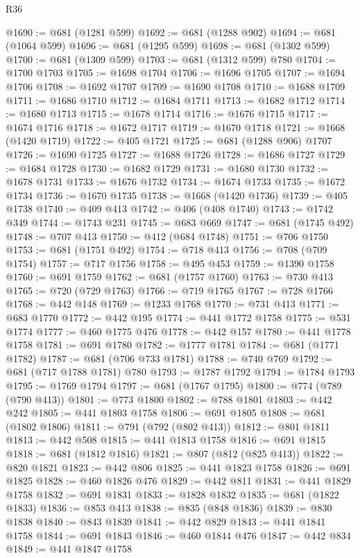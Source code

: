 \begin{lexlean}{R36}
\begin{coremodule}
@1690 := @681 (@1281 @599)
@1692 := @681 (@1288 @902)
@1694 := @681 (@1064 @599)
@1696 := @681 (@1295 @599)
@1698 := @681 (@1302 @599)
@1700 := @681 (@1309 @599)
@1703 := @681 (@1312 @599) @780
@1704 := @1700 @1703
@1705 := @1698 @1704
@1706 := @1696 @1705
@1707 := @1694 @1706
@1708 := @1692 @1707
@1709 := @1690 @1708
@1710 := @1688 @1709
@1711 := @1686 @1710
@1712 := @1684 @1711
@1713 := @1682 @1712
@1714 := @1680 @1713
@1715 := @1678 @1714
@1716 := @1676 @1715
@1717 := @1674 @1716
@1718 := @1672 @1717
@1719 := @1670 @1718
@1721 := @1668 (@1420 @1719)
@1722 := @405 @1721
@1725 := @681 (@1288 @906) @1707
@1726 := @1690 @1725
@1727 := @1688 @1726
@1728 := @1686 @1727
@1729 := @1684 @1728
@1730 := @1682 @1729
@1731 := @1680 @1730
@1732 := @1678 @1731
@1733 := @1676 @1732
@1734 := @1674 @1733
@1735 := @1672 @1734
@1736 := @1670 @1735
@1738 := @1668 (@1420 @1736)
@1739 := @405 @1738
@1740 := @409 @413
@1742 := @406 (@408 @1740)
@1743 := @1742 @349
@1744 := @1743 @231
@1745 := @683 @669
@1747 := @681 (@1745 @492)
@1748 := @707 @413
@1750 := @412 (@684 @1748)
@1751 := @706 @1750
@1753 := @681 (@1751 @492)
@1754 := @718 @413
@1756 := @708 (@709 @1754)
@1757 := @717 @1756
@1758 := @495 @453
@1759 := @1390 @1758
@1760 := @691 @1759
@1762 := @681 (@1757 @1760)
@1763 := @730 @413
@1765 := @720 (@729 @1763)
@1766 := @719 @1765
@1767 := @728 @1766
@1768 := @442 @148
@1769 := @1233 @1768
@1770 := @731 @413
@1771 := @683 @1770
@1772 := @442 @195
@1774 := @441 @1772 @1758
@1775 := @531 @1774
@1777 := @460 @1775 @476
@1778 := @442 @157
@1780 := @441 @1778 @1758
@1781 := @691 @1780
@1782 := @1777 @1781
@1784 := @681 (@1771 @1782)
@1787 := @681 (@706 @733 @1781)
@1788 := @740 @769
@1792 := @681 (@717 @1788 @1781) @780
@1793 := @1787 @1792
@1794 := @1784 @1793
@1795 := @1769 @1794
@1797 := @681 (@1767 @1795)
@1800 := @774 (@789 (@790 @413))
@1801 := @773 @1800
@1802 := @788 @1801
@1803 := @442 @242
@1805 := @441 @1803 @1758
@1806 := @691 @1805
@1808 := @681 (@1802 @1806)
@1811 := @791 (@792 (@802 @413))
@1812 := @801 @1811
@1813 := @442 @508
@1815 := @441 @1813 @1758
@1816 := @691 @1815
@1818 := @681 (@1812 @1816)
@1821 := @807 (@812 (@825 @413))
@1822 := @820 @1821
@1823 := @442 @806
@1825 := @441 @1823 @1758
@1826 := @691 @1825
@1828 := @460 @1826 @476
@1829 := @442 @811
@1831 := @441 @1829 @1758
@1832 := @691 @1831
@1833 := @1828 @1832
@1835 := @681 (@1822 @1833)
@1836 := @853 @413
@1838 := @835 (@848 @1836)
@1839 := @830 @1838
@1840 := @843 @1839
@1841 := @442 @829
@1843 := @441 @1841 @1758
@1844 := @691 @1843
@1846 := @460 @1844 @476
@1847 := @442 @834
@1849 := @441 @1847 @1758

\end{coremodule}
\end{lexlean}
